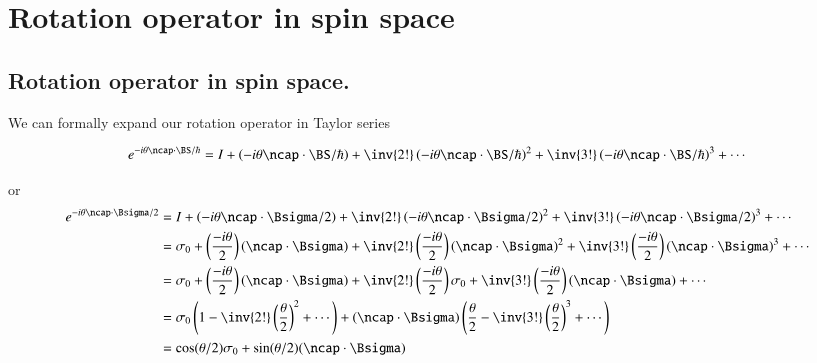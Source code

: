 %
%

\chapter{Rotation operator in spin space}
\label{chap:qmTwoL15}
{}
\date{Oct 31, 2011}

\beginArtWithToc

%
%
\section{Rotation operator in spin space.}

We can formally expand our rotation operator in Taylor series

\begin{equation}\label{eqn:qmTwoL15:10}
e^{-i \theta \ncap \cdot \BS/\hbar}
= 
I 
+
\left(-i \theta \ncap \cdot \BS/\hbar\right)
+
\inv{2!}
\left(-i \theta \ncap \cdot \BS/\hbar\right)^2
+
\inv{3!}
\left(-i \theta \ncap \cdot \BS/\hbar\right)^3
+ \cdots
\end{equation}

or
\begin{align*}
e^{-i \theta \ncap \cdot \Bsigma/2}
&= 
I 
+
\left(-i \theta \ncap \cdot \Bsigma/2\right)
+
\inv{2!}
\left(-i \theta \ncap \cdot \Bsigma/2\right)^2
+
\inv{3!}
\left(-i \theta \ncap \cdot \Bsigma/2\right)^3
+ \cdots \\
&=
\sigma_0 
+
\left(\frac{-i \theta}{2}\right) (\ncap \cdot \Bsigma)
+
\inv{2!} \left(\frac{-i \theta}{2}\right) (\ncap \cdot \Bsigma)^2
+
\inv{3!} \left(\frac{-i \theta}{2}\right) (\ncap \cdot \Bsigma)^3
+ \cdots \\
&=
\sigma_0 
+
\left(\frac{-i \theta}{2}\right) (\ncap \cdot \Bsigma)
+
\inv{2!} \left(\frac{-i \theta}{2}\right) \sigma_0
+
\inv{3!} \left(\frac{-i \theta}{2}\right) (\ncap \cdot \Bsigma) 
+ \cdots \\
&=
\sigma_0 \left( 1 - \inv{2!}\left(\frac{\theta}{2}\right)^2 + \cdots \right) 
+
(\ncap \cdot \Bsigma) \left( \frac{\theta}{2} - \inv{3!}\left(\frac{\theta}{2}\right)^3 + \cdots \right) \\
&=
\cos(\theta/2) \sigma_0 + \sin(\theta/2) (\ncap \cdot \Bsigma)
\end{align*}

